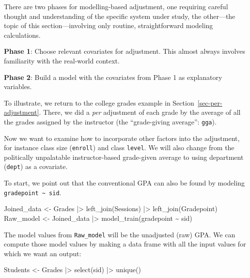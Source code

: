 \documentclass[
  letterpaper,
  DIV=11,
  numbers=noendperiod,
  oneside]{scrartcl}
\newenvironment{Shaded}{\begin{snugshade}}{\end{snugshade}}
\newcommand{\FunctionTok}[1]{\textcolor[rgb]{0.28,0.35,0.67}{#1}}
\newcommand{\NormalTok}[1]{\textcolor[rgb]{0.00,0.23,0.31}{#1}}
\newcommand{\OtherTok}[1]{\textcolor[rgb]{0.00,0.23,0.31}{#1}}
\newcommand{\SpecialCharTok}[1]{\textcolor[rgb]{0.37,0.37,0.37}{#1}}
\begin{document}
There are two phases for modelling-based adjustment, one requiring
careful thought and understanding of the specific system under study,
the other---the topic of this section---involving only routine,
straightforward modeling calculations.

\textbf{Phase 1}: Choose relevant covariates for adjustment. This almost
always involves familiarity with the real-world context.

\textbf{Phase 2}: Build a model with the covariates from Phase 1 as
explanatory variables.

To illustrate, we return to the college grades example in
Section~\ref{sec-per-adjustment}. There, we did a \emph{per} adjustment
of each grade by the average of all the grades assigned by the
instructor (the ``grade-giving average'': \texttt{gga}).

Now we want to examine how to incorporate other factors into the
adjustment, for instance class size (\texttt{enroll}) and class
\texttt{level}. We will also change from the politically unpalatable
instructor-based grade-given average to using department (\texttt{dept})
as a covariate.

To start, we point out that the conventional GPA can also be found by
modeling \texttt{gradepoint\ \textasciitilde{}\ sid}.

\begin{Shaded}
\begin{Highlighting}[]
\NormalTok{Joined\_data }\OtherTok{\textless{}{-}}\NormalTok{   Grades }\SpecialCharTok{|\textgreater{}} 
  \FunctionTok{left\_join}\NormalTok{(Sessions) }\SpecialCharTok{|\textgreater{}}
  \FunctionTok{left\_join}\NormalTok{(Gradepoint) }
\NormalTok{Raw\_model }\OtherTok{\textless{}{-}} 
\NormalTok{  Joined\_data }\SpecialCharTok{|\textgreater{}} 
  \FunctionTok{model\_train}\NormalTok{(gradepoint }\SpecialCharTok{\textasciitilde{}}\NormalTok{ sid)}
\end{Highlighting}
\end{Shaded}

The model values from \texttt{Raw\_model} will be the unadjusted (raw)
GPA. We can compute those model values by making a data frame with all
the input values for which we want an output:

\begin{Shaded}
\begin{Highlighting}[]
\NormalTok{Students }\OtherTok{\textless{}{-}}\NormalTok{ Grades }\SpecialCharTok{|\textgreater{}} \FunctionTok{select}\NormalTok{(sid) }\SpecialCharTok{|\textgreater{}} \FunctionTok{unique}\NormalTok{()}
\end{Highlighting}
\end{Shaded}
\end{document}
